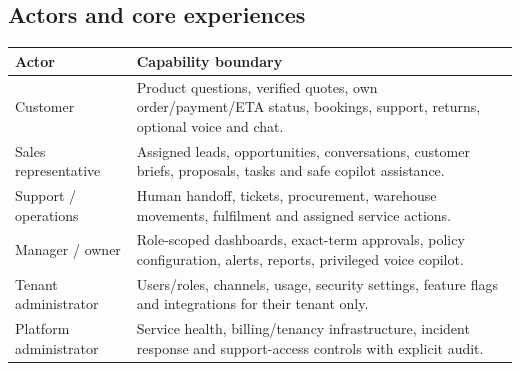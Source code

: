 \documentclass[10.5pt,a4paper,oneside]{article}
\begin{document}
\subsection{Actors and core experiences}
\begin{tabularx}{\textwidth}{@{}L{33mm}Y@{}}
\toprule{}\textbf{Actor} & \textbf{Capability boundary}\\\midrule
Customer & Product questions, verified quotes, own order/payment/ETA status, bookings, support, returns, optional voice and chat.\\
Sales representative & Assigned leads, opportunities, conversations, customer briefs, proposals, tasks and safe copilot assistance.\\
Support / operations & Human handoff, tickets, procurement, warehouse movements, fulfilment and assigned service actions.\\
Manager / owner & Role-scoped dashboards, exact-term approvals, policy configuration, alerts, reports, privileged voice copilot.\\
Tenant administrator & Users/roles, channels, usage, security settings, feature flags and integrations for their tenant only.\\
Platform administrator & Service health, billing/tenancy infrastructure, incident response and support-access controls with explicit audit.\\
\bottomrule
\end{tabularx}
\end{document}

